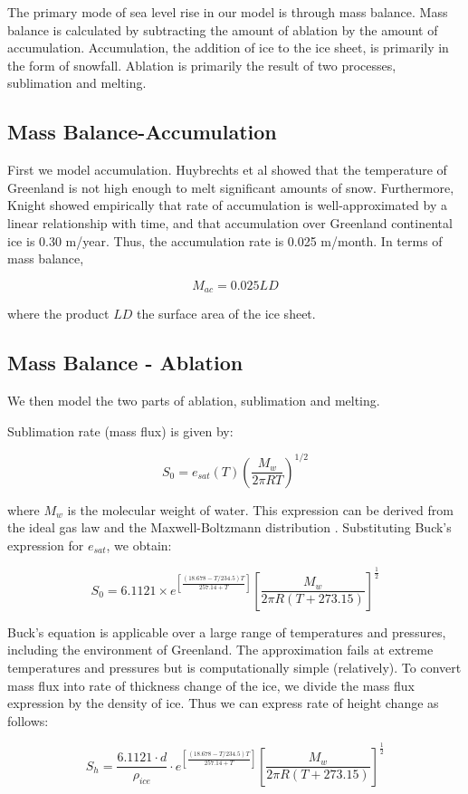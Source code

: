 \documentclass[12pt,a4paper,titlepage]{article}
\begin{document}
The primary mode of sea level rise in our model is through mass
balance. Mass balance is calculated by subtracting the amount of
ablation by the amount of accumulation. Accumulation, the addition
of ice to the ice sheet, is primarily in the form of snowfall.
Ablation is primarily the result of two processes, sublimation and
melting.

\subsection{Mass Balance-Accumulation}

First we model accumulation. Huybrechts et al showed that the
temperature of Greenland is not high enough to melt significant
amounts of snow. Furthermore, Knight showed empirically that rate
of accumulation is well-approximated by a linear relationship with
time, and that accumulation over Greenland continental ice is 0.30
m/year. Thus, the accumulation rate is 0.025 m/month. In terms of
mass balance,

\[
M_{ac}=0.025LD
\]

where the product $LD$ the surface area of the ice sheet.


\subsection{Mass Balance - Ablation }

We then model the two parts of ablation, sublimation and melting.

Sublimation rate (mass flux) is given by:

\[
S_0=e_{sat}(T)(\frac{M_w}{2\pi RT})^{1/2}
\]


where $M_w$ is the molecular weight of water. This expression can
be derived from the ideal gas law and the Maxwell-Boltzmann
distribution . Substituting Buck's expression for $e_{sat}$, we
obtain:

\[
S_{0}=6.1121\times
e^{[\frac{(18.678-T/234.5)T}{257.14+T}]}[\frac{M_w}{2\pi
R(T+273.15)}]^{\frac{1}{2}}
\]

Buck's equation is applicable over a large range of temperatures
and pressures, including the environment of Greenland. The
approximation fails at extreme temperatures and pressures but is
computationally simple (relatively). To convert mass flux into
rate of thickness change of the ice, we divide the mass flux
expression by the density of ice. Thus we can express rate of
height change as follows:

\[
S_h=\frac{6.1121\cdot d}{\rho_{ice}}\cdot
e^{[\frac{(18.678-T/234.5)T}{257.14+T}]}[\frac{M_w}{2\pi
R(T+273.15)}]^\frac{1}{2}
\]
\end{document}
